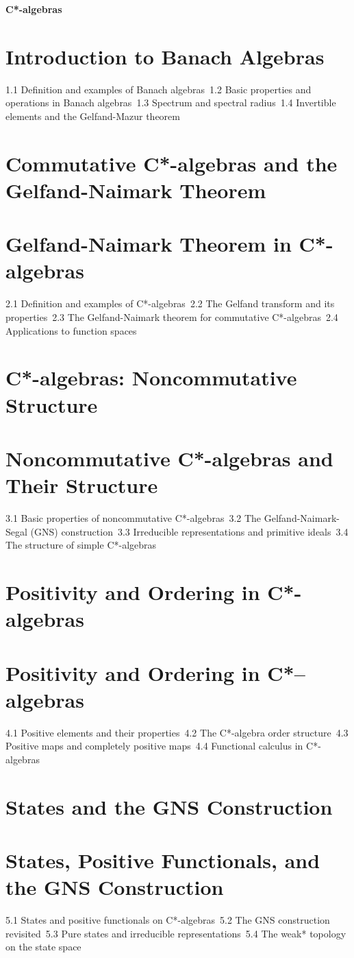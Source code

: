{\LARGE \bf{C*-algebras}}
\section{Introduction to Banach Algebras}
1.1 Definition and examples of Banach algebras\
1.2 Basic properties and operations in Banach algebras\
1.3 Spectrum and spectral radius\
1.4 Invertible elements and the Gelfand-Mazur theorem\
\section{Commutative C*-algebras and the Gelfand-Naimark Theorem}
\section{Gelfand-Naimark Theorem in C*-algebras}
2.1 Definition and examples of C*-algebras\
2.2 The Gelfand transform and its properties\
2.3 The Gelfand-Naimark theorem for commutative C*-algebras\
2.4 Applications to function spaces\
\section{C*-algebras: Noncommutative Structure}
\section{Noncommutative C*-algebras and Their Structure}
3.1 Basic properties of noncommutative C*-algebras\
3.2 The Gelfand-Naimark-Segal (GNS) construction\
3.3 Irreducible representations and primitive ideals\
3.4 The structure of simple C*-algebras\
\section{Positivity and Ordering in C*-algebras}
\section{Positivity and Ordering in C*–algebras}
4.1 Positive elements and their properties\
4.2 The C*-algebra order structure\
4.3 Positive maps and completely positive maps\
4.4 Functional calculus in C*-algebras\
\section{States and the GNS Construction}
\section{States, Positive Functionals, and the GNS Construction}
5.1 States and positive functionals on C*-algebras\
5.2 The GNS construction revisited\
5.3 Pure states and irreducible representations\
5.4 The weak* topology on the state space\
